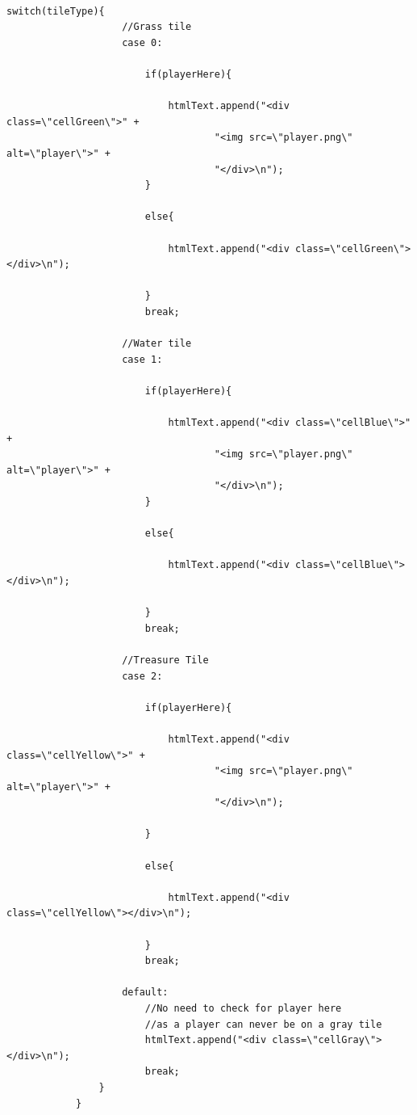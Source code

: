 \documentclass[a4paper,12pt]{extarticle}
\begin{document}
\begin{lstlisting}

switch(tileType){
                    //Grass tile
                    case 0:

                        if(playerHere){

                            htmlText.append("<div class=\"cellGreen\">" +
                                    "<img src=\"player.png\" alt=\"player\">" +
                                    "</div>\n");
                        }

                        else{

                            htmlText.append("<div class=\"cellGreen\"></div>\n");

                        }
                        break;

                    //Water tile
                    case 1:

                        if(playerHere){

                            htmlText.append("<div class=\"cellBlue\">" +
                                    "<img src=\"player.png\" alt=\"player\">" +
                                    "</div>\n");
                        }

                        else{

                            htmlText.append("<div class=\"cellBlue\"></div>\n");

                        }
                        break;

                    //Treasure Tile
                    case 2:

                        if(playerHere){

                            htmlText.append("<div class=\"cellYellow\">" +
                                    "<img src=\"player.png\" alt=\"player\">" +
                                    "</div>\n");

                        }

                        else{

                            htmlText.append("<div class=\"cellYellow\"></div>\n");

                        }
                        break;

                    default:
                        //No need to check for player here
                        //as a player can never be on a gray tile
                        htmlText.append("<div class=\"cellGray\"></div>\n");
                        break;
                }
            }

\end{lstlisting}
\vspace{4mm}
\end{document}
